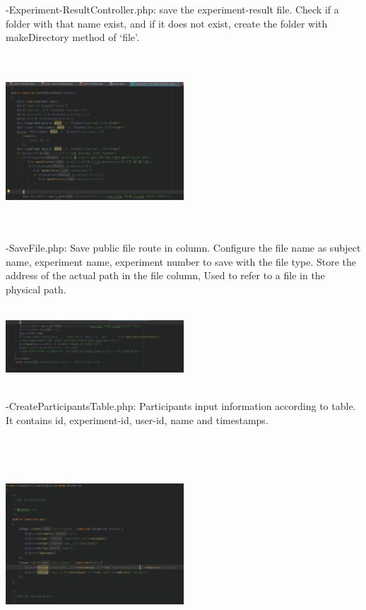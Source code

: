 \documentclass[letterpaper, 10 pt, conference]{ieeeconf}  %
\begin{document}
-Experiment-ResultController.php: save the experiment-result file. Check if a folder with that name exist, and if it does not exist, create the folder with makeDirectory method of ‘file’.
\begin{center}
\includegraphics[width=0.5\textwidth,height = 6.5cm]{class/7.png}
\end{center}

-SaveFile.php: Save public file route in column. Configure the file name as subject name, experiment name, experiment number to save with the file type. Store the address of the actual path in the file column, Used to refer to a file in the physical path.
\begin{center}
\includegraphics[width=0.5\textwidth,height = 3cm]{class/9.png}
\end{center}

-CreateParticipantsTable.php: Participants input information according to table. It contains id, experiment-id, user-id, name and timestamps.
\begin{center}
\includegraphics[width=0.5\textwidth,height = 8cm]{class/10.png}
\end{center}
\end{document}
